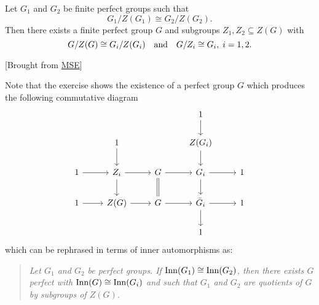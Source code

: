 \begin{solution}
\begin{exr}
    Let\/ $G_1$ and\/ $G_2$ be finite perfect groups such that
    $$
        G_1/Z(G_1)\cong G_2/Z(G_2).
    $$
    Then there exists a finite perfect group\/ $G$ and subgroups\/ $Z_1, Z_2 \subseteq Z(G)$ with
    $$
        G/Z(G) \cong G_i/Z(G_i)\quad\text{\rm and}\quad G/Z_i \cong G_i,\; i=1,2.
    $$
\end{exr}

\begin{solution} {[Brought from \href{https://math.stackexchange.com/a/3419168/269050}{MSE}]}

{\small Note that the exercise shows the existence of a perfect group $G$ which produces the following commutative diagram
$$
    \begin{tikzcd}
        &&&1\arrow[d]\\
        &1\arrow[d]&&Z(G_i)\arrow[d]\\
        1\arrow[r]
            &Z_i\arrow[r]\arrow[d]
            &G\arrow[r]\arrow[d,no head, equal]
            &G_i\arrow[r]\arrow[d]&1\\
        1\arrow[r]
            &Z(G)\arrow[r]
            &G\arrow[r]
            &\bar G_i\arrow[r]\arrow[d]
            &1\\
        &&&1
\end{tikzcd}
$$
which can be rephrased in terms of inner automorphisms as: 
\begin{quote}
    \textit{Let\/ $G_1$ and\/ $G_2$ be perfect groups. If\/ ${\rm Inn}(G_1)\cong{\rm Inn}(G_2)$, then there exists\/ $G$ perfect with\/ ${\rm Inn}(G)\cong{\rm Inn}(G_i)$ and such that\/ $G_1$ and\/ $G_2$ are quotients of\/ $G$ by subgroups of\/ $Z(G)$.}
\end{quote}}


\end{solution}
\end{solution}
